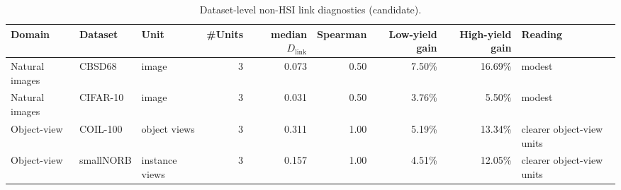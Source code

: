 
\begin{table}[t]
\centering
\caption{Dataset-level non-HSI link diagnostics (candidate).}
\begin{tabular}{@{}l l l r r r r r l@{}}
\toprule
Domain & Dataset & Unit & \#Units & median $D_{\mathrm{link}}$ & Spearman & Low-yield gain & High-yield gain & Reading \\
\midrule
Natural images & CBSD68 & image & 3 & 0.073 & 0.50 & 7.50\% & 16.69\% & modest \\
Natural images & CIFAR-10 & image & 3 & 0.031 & 0.50 & 3.76\% & 5.50\% & modest \\
Object-view & COIL-100 & object views & 3 & 0.311 & 1.00 & 5.19\% & 13.34\% & clearer object-view units \\
Object-view & smallNORB & instance views & 3 & 0.157 & 1.00 & 4.51\% & 12.05\% & clearer object-view units \\
\bottomrule
\end{tabular}
\end{table}

